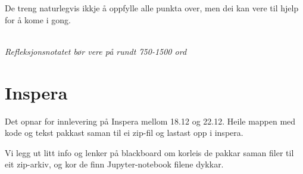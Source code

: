 \documentclass[12pt, titlepage]{article}
\begin{document}
De treng naturlegvis ikkje å oppfylle alle punkta over, men dei kan vere til hjelp for å kome i gong.

~\\
\textit{Refleksjonsnotatet bør vere på rundt 750-1500 ord}

\section*{Inspera}

Det opnar for innlevering på Inspera mellom 18.12 og 22.12.
Heile mappen med kode og tekst pakkast saman til ei zip-fil og lastast opp i inspera.

Vi legg ut litt info og lenker på blackboard om korleis de pakkar saman filer til eit zip-arkiv, og kor de finn Jupyter-notebook filene dykkar.
\end{document}
